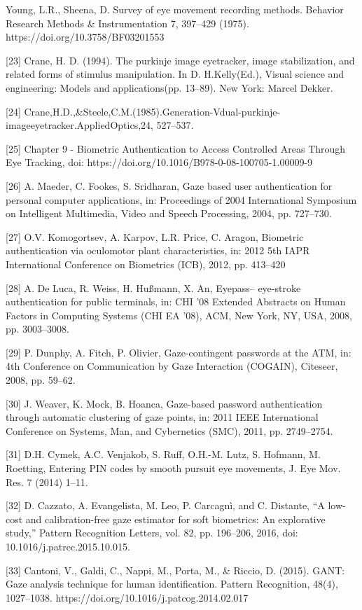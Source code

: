 \documentclass{article}
\begin{document}
\begin{raggedright}
[22] Young, L.R., Sheena, D. Survey of eye movement recording methods. Behavior Research Methods \& Instrumentation 7, 397–429 (1975). https://doi.org/10.3758/BF03201553

[23] Crane, H. D. (1994). The purkinje image eyetracker, image stabilization, and related forms of stimulus manipulation. In D. H.Kelly(Ed.), Visual science and engineering: Models and applications(pp. 13–89). New York: Marcel Dekker.

[24] Crane,H.D.,\&Steele,C.M.(1985).Generation-Vdual-purkinje-imageeyetracker.AppliedOptics,24, 527–537.

[25] Chapter 9 - Biometric Authentication to Access Controlled Areas Through Eye Tracking, doi: https://doi.org/10.1016/B978-0-08-100705-1.00009-9

[26] A. Maeder, C. Fookes, S. Sridharan, Gaze based user authentication for personal computer applications, in: Proceedings of 2004 International Symposium on Intelligent Multimedia, Video and Speech Processing, 2004, pp. 727–730.

[27] O.V. Komogortsev, A. Karpov, L.R. Price, C. Aragon, Biometric authentication via oculomotor plant characteristics, in: 2012 5th IAPR International Conference on Biometrics (ICB), 2012, pp. 413–420

[28] A. De Luca, R. Weiss, H. Hußmann, X. An, Eyepass– eye-stroke authentication for public terminals, in: CHI '08 Extended Abstracts on Human Factors in Computing Systems (CHI EA '08), ACM, New York, NY, USA, 2008, pp. 3003–3008.

[29] P. Dunphy, A. Fitch, P. Olivier, Gaze-contingent passwords at the ATM, in: 4th Conference on Communication by Gaze Interaction (COGAIN), Citeseer, 2008, pp. 59–62.

[30] J. Weaver, K. Mock, B. Hoanca, Gaze-based password authentication through automatic clustering of gaze points, in: 2011 IEEE International Conference on Systems, Man, and Cybernetics (SMC), 2011, pp. 2749–2754.

[31] D.H. Cymek, A.C. Venjakob, S. Ruff, O.H.-M. Lutz, S. Hofmann, M. Roetting, Entering PIN codes by smooth pursuit eye movements, J. Eye Mov. Res. 7 (2014) 1–11.

[32] D. Cazzato, A. Evangelista, M. Leo, P. Carcagnì, and C. Distante, “A low-cost and calibration-free gaze estimator for soft biometrics: An explorative study,” Pattern Recognition Letters, vol. 82, pp. 196–206, 2016, doi: 10.1016/j.patrec.2015.10.015.

[33] Cantoni, V., Galdi, C., Nappi, M., Porta, M., \& Riccio, D. (2015). GANT: Gaze analysis technique for human identification. Pattern Recognition, 48(4), 1027–1038. https://doi.org/10.1016/j.patcog.2014.02.017


\end{raggedright}
\end{document}
